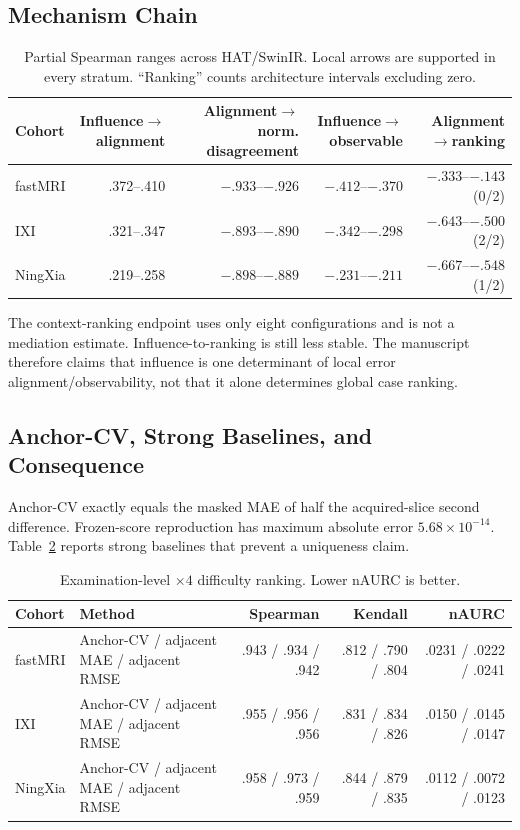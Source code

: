 \subsection{Mechanism Chain}
\begin{table}[t]
\centering
\caption{Partial Spearman ranges across HAT/SwinIR. Local arrows are supported in every stratum. “Ranking” counts architecture intervals excluding zero.}
\label{tab:chain}
\setlength{\tabcolsep}{3.5pt}
\begin{tabular}{lrrrr}
\toprule
Cohort & Influence$\rightarrow$alignment & Alignment$\rightarrow$norm. disagreement & Influence$\rightarrow$observable & Alignment$\rightarrow$ranking \\
\midrule
fastMRI & .372--.410 & $-.933$--$-.926$ & $-.412$--$-.370$ & $-.333$--$-.143$ (0/2) \\
IXI & .321--.347 & $-.893$--$-.890$ & $-.342$--$-.298$ & $-.643$--$-.500$ (2/2) \\
NingXia & .219--.258 & $-.898$--$-.889$ & $-.231$--$-.211$ & $-.667$--$-.548$ (1/2) \\
\bottomrule
\end{tabular}
\end{table}

The context-ranking endpoint uses only eight configurations and is not a mediation estimate. Influence-to-ranking is still less stable. The manuscript therefore claims that influence is one determinant of local error alignment/observability, not that it alone determines global case ranking.

\subsection{Anchor-CV, Strong Baselines, and Consequence}
Anchor-CV exactly equals the masked MAE of half the acquired-slice second difference. Frozen-score reproduction has maximum absolute error $5.68\times10^{-14}$. Table~\ref{tab:anchor} reports strong baselines that prevent a uniqueness claim.

\begin{table}[t]
\centering
\caption{Examination-level $\times4$ difficulty ranking. Lower nAURC is better.}
\label{tab:anchor}
\setlength{\tabcolsep}{5pt}
\begin{tabular}{llrrr}
\toprule
Cohort & Method & Spearman & Kendall & nAURC \\
\midrule
fastMRI & Anchor-CV / adjacent MAE / adjacent RMSE & .943 / .934 / .942 & .812 / .790 / .804 & .0231 / .0222 / .0241 \\
IXI & Anchor-CV / adjacent MAE / adjacent RMSE & .955 / .956 / .956 & .831 / .834 / .826 & .0150 / .0145 / .0147 \\
NingXia & Anchor-CV / adjacent MAE / adjacent RMSE & .958 / .973 / .959 & .844 / .879 / .835 & .0112 / .0072 / .0123 \\
\bottomrule
\end{tabular}
\end{table}

